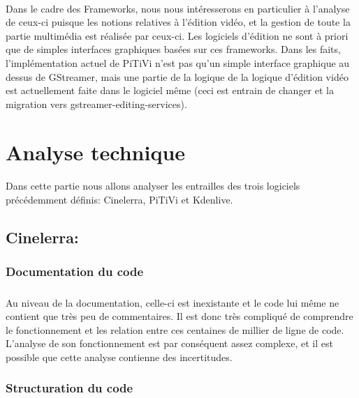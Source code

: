 \paragraph {}

Dans le cadre des Frameworks, nous nous intéresserons en particulier
à l'analyse de ceux-ci puisque les notions relatives à l'édition
vidéo, et la gestion de toute la partie multimédia est réalisée
par ceux-ci. Les logiciels d'édition ne sont à priori que de simples
interfaces graphiques basées sur ces frameworks. Dans les faits,
l'implémentation actuel de PiTiVi n'est pas qu'un simple interface
graphique au dessus de GStreamer, mais une partie de la logique de la
logique d'édition vidéo est actuellement faite dans le logiciel même
(ceci est entrain de changer et la migration \cite{PitviPortToGes}
vers gstreamer-editing-services\cite{PresentationOfGes}).

\newpage \section{Analyse technique}

\paragraph {}

Dans cette partie nous allons analyser les entrailles des trois logiciels
précédemment définis: Cinelerra, PiTiVi et Kdenlive.

\subsection{Cinelerra:}

\subsubsection{Documentation du code}

\subparagraph{}

Au niveau de la documentation, celle-ci est inexistante et le code
lui même ne contient que très peu de commentaires. Il est donc très
compliqué de comprendre le fonctionnement et les relation entre ces
centaines de millier de ligne de code. L'analyse de son fonctionnement
est par conséquent assez complexe, et il est possible que cette analyse
contienne des incertitudes.

\subsubsection {Structuration du code}


